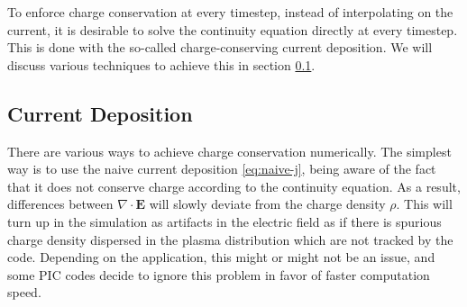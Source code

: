 To enforce charge conservation at every timestep, instead of interpolating on
the current, it is desirable to solve the continuity equation directly at every
timestep. This is done with the so-called charge-conserving current deposition.
We will discuss various techniques to achieve this in section
\ref{sec:charge-cons-curr}.




\subsection{Current Deposition}
\label{sec:charge-cons-curr}

There are various ways to achieve charge conservation numerically. The simplest
way is to use the naive current deposition \eqref{eq:naive-j}, being aware of
the fact that it does not conserve charge according to the continuity equation.
As a result, differences between $\nabla\cdot \mathbf{E}$ will slowly deviate
from the charge density $\rho$. This will turn up in the simulation as artifacts
in the electric field as if there is spurious charge density dispersed in the
plasma distribution which are not tracked by the code. Depending on the
application, this might or might not be an issue, and some PIC codes decide to
ignore this problem in favor of faster computation speed.

